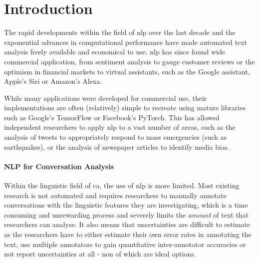 \newpage
\renewcommand{\headrulewidth}{0.5pt}%
\chapter{Introduction}

The rapid developments within the field of \gls{nlp} over the last decade and the exponential advances in computational performance\cite{mooresLaw} have made automated text analysis freely available and economical to use. \Gls{nlp} has since found wide commercial application, from sentiment analysis to gauge customer reviews or the optimism in financial markets\cite{sentimentReview} to virtual assistants, such as the Google assistant, Apple's Siri or Amazon's Alexa\cite{virtualAssistants}.

While many applications were developed for commercial use, their implementations are often (relatively) simple to recreate using mature libraries such as Google's TensorFlow\cite{abadi2016tensorflow} or Facebook's PyTorch\cite{paszke2019pytorch}. This has allowed independent researchers to apply \gls{nlp} to a vast number of areas, such as the analysis of tweets to appropriately respond to mass emergencies (such as earthquakes)\cite{twitterEmergencies}, or the analysis of newspaper articles to identify media bias\cite{mediaBias}.

\subsubsection{NLP for Conversation Analysis}
Within the linguistic field of \gls{ca}, the use of \gls{nlp} is more limited. 
Most existing research is not automated and requires researchers to manually annotate conversations with the linguistic features they are investigating, which is a time consuming and unrewarding process and severely limits the \textit{amount} of text that researchers can analyse. It also means that uncertainties are difficult to estimate as the researchers have to either estimate their own error rates in annotating the text, use multiple annotators to gain quantitative inter-annotator accuracies or not report uncertainties at all - non of which are ideal options.

